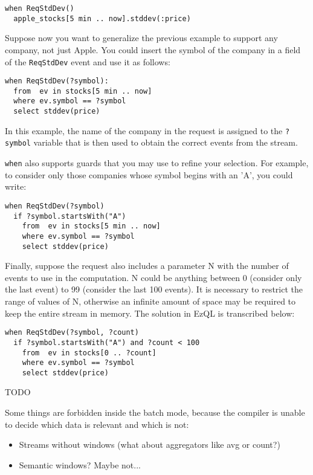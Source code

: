 \documentclass{report}
\begin{document}
\begin{verbatim}
when ReqStdDev()
  apple_stocks[5 min .. now].stddev(:price)
\end{verbatim}

Suppose now you want to generalize the previous example to support any
company, not just Apple. You could insert the symbol of the company in
a field of the \verb=ReqStdDev= event and use it as follows:

\begin{verbatim}
when ReqStdDev(?symbol):
  from  ev in stocks[5 min .. now]
  where ev.symbol == ?symbol
  select stddev(price)
\end{verbatim}

In this example, the name of the company in the request is assigned to
the \verb=?symbol= variable that is then used to obtain the correct
events from the stream.

\verb=when= also supports guards that you may use to refine your
selection. For example, to consider only those companies whose symbol
begins with an 'A', you could write:

\begin{verbatim}
when ReqStdDev(?symbol)
  if ?symbol.startsWith("A")
    from  ev in stocks[5 min .. now]
    where ev.symbol == ?symbol
    select stddev(price)
\end{verbatim}

Finally, suppose the request also includes a parameter N with the
number of events to use in the computation. N could be anything
between 0 (consider only the last event) to 99 (consider the last 100
events). It is necessary to restrict the range of values of N,
otherwise an infinite amount of space may be required to keep the
entire stream in memory. The solution in EzQL is transcribed below:

\begin{verbatim}
when ReqStdDev(?symbol, ?count)
  if ?symbol.startsWith("A") and ?count < 100
    from  ev in stocks[0 .. ?count]
    where ev.symbol == ?symbol
    select stddev(price)
\end{verbatim}


TODO

Some things are forbidden inside the batch mode, because the compiler
is unable to decide which data is relevant and which is not:

\begin{itemize}
\item Streams without windows (what about aggregators like avg or count?)
\item Semantic windows? Maybe not...
\end{itemize}
\end{document}
